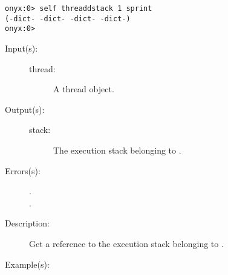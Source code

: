 \begin{description}
\begin{description}
\begin{verbatim}
onyx:0> self threaddstack 1 sprint
(-dict- -dict- -dict- -dict-)
onyx:0>
		\end{verbatim}
	\end{description}
\label{systemdict:threadestack}
\item[{\onyxop{thread}{threadestack}{stack}}: ]
	\begin{description}\item[]
	\item[Input(s): ]
		\begin{description}\item[]
		\item[thread: ]
			A thread object.
		\end{description}
	\item[Output(s): ]
		\begin{description}\item[]
		\item[stack: ]
			The execution stack belonging to .
		\end{description}
	\item[Errors(s): ]
		\begin{description}\item[]
		\item[.]
		\item[.]
		\end{description}
	\item[Description: ]
		Get a reference to the execution stack belonging to
		.
	\item[Example(s): ]\begin{verbatim}


\end{verbatim}
\end{description}
\end{description}
